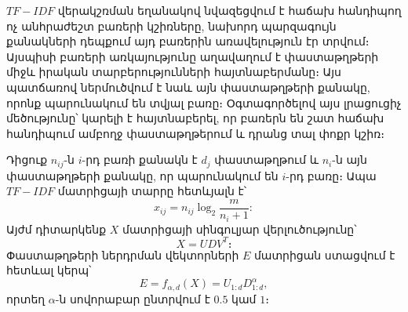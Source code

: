 \documentclass[11pt]{article}
\begin{document}
\par $TF-IDF$ վերակշռման եղանակով նվազեցվում է հաճախ հանդիպող ոչ անհրաժեշտ բառերի  կշիռները, նախորդ պարզագույն քանակների  դեպքում այդ բառերին առավելություն էր տրվում։ Այսպիսի բառերի առկայությունը աղավաղում է փաստաթղթերի միջև իրական տարբերությունների հայտնաբերմանը։ Այս պատճառով ներմուծվում է նաև այն փաստաթղթերի քանակը, որոնք պարունակում են տվյալ բառը։  Օգտագործելով այս լրացուցիչ մեծությունը՝ կարելի է հայտնաբերել, որ բառերն են շատ հաճախ հանդիպում ամբողջ փաստաթղթերում և դրանց տալ փոքր կշիռ։  
\par Դիցուք $n_{ij}$-ն $i$-րդ բառի քանակն է $d_j$ փաստաթղթում և $n_i$-ն այն փաստաթղթերի քանակը, որ պարունակում են $i$-րդ բառը։  Ապա $TF-IDF$ մատրիցայի տարրը հետևյալն է՝ $$x_{ij} = n_{ij}  \log_2{\frac{m}{n_i+1}}:$$
Այժմ դիտարկենք $X$ մատրիցայի սինգուլյար վերլուծությունը՝  $$X= UDV^T։$$ Փաստաթղթերի ներդրման վեկտորների $E$ մատրիցան ստացվում է հետևալ կերպ՝
$$E = f_{\alpha, d}(X) = U_{1:d}D^{\alpha} _{1:d},$$
որտեղ $\alpha$-ն սովորաբար ընտրվում է $0.5$ կամ $1$։
\end{document}
